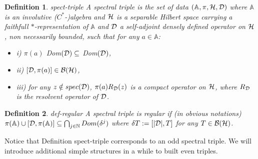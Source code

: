 \documentclass[10pt]{book}
\theoremstyle{break}
\newtheorem{definition}{Definition}
\begin{document}
\begin{definition}{spect-triple}
A spectral triple is the set of data $(\mathbb{A},\pi,{\cal{H}},{\cal{D}})$ where $\mathbb{A}$ is an involutive ($C^*$-)algebra and ${\cal{H}}$ is a separable Hilbert space carrying a faithfull $*$-representation of $\mathbb{A}$ and  ${\cal{D}}$ a self-adjoint densely defined operator on ${\cal{H}}$, non necessarily bounded, such that for any $a\in\mathbb{A}$:
\begin{itemize}
\vspace*{-3pt}
\setlength{\itemsep}{-1pt}
\item i) $\pi(a)$ Dom$({\cal{D}})\subseteq$ Dom$({\cal{D}})$,
\item ii) $[{\cal{D}},\pi(a)]\in{\cal{B}}({\cal{H}})$,
\item iii) for any $z\notin spec({\cal{D}})$, $\pi(a)R_{{\cal{D}}}(z)$ is a compact operator on ${\cal{H}}$, where $R_{{\cal{D}}}$ is the resolvent operator of ${\cal{D}}$.
\end{itemize}
\end{definition}

\begin{definition}{def-regular}
A spectral triple is regular if (in obvious notations) $\pi(\mathbb{A})\cup[{\cal{D}},\pi(\mathbb{A})]\subseteq\bigcap_{j\in\mathbb{N}}Dom(\delta^j)$ where $\delta T:=[|{\cal{D}}|,T]$ for any $T\in{\cal{B}}({\cal{H}})$.
\end{definition}
Notice that Definition {spect-triple} corresponds to an odd spectral triple. We will introduce additional simple structures in a while to built even triples.\par
\end{document}

